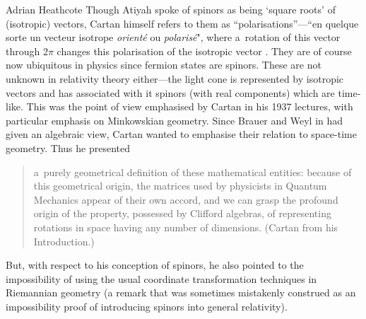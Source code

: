 \begin{artengenv}{Adrian Heathcote}
Though Atiyah spoke of spinors as being `square roots' of (isotropic) vectors, Cartan himself refers to them as ``polarisations''---``en quelque sorte un vecteur isotrope \textit{orienté} ou \textit{polarisé}", where a~rotation of this vector through 2$\pi$ changes this polarisation of the isotropic vector \parencite[42]{cartan_theory_1966}. They are of course now ubiquitous in physics since fermion states are spinors. These are not unknown in relativity theory either---the light cone is represented by isotropic vectors and has associated with it spinors (with real components) which are time-like. This was the point of view emphasised by Cartan in his 1937 lectures, with particular emphasis on Minkowskian geometry. Since Brauer and Weyl in \parencite*{brauer_spinors_1935} had given an algebraic view, Cartan wanted to emphasise their relation to space-time geometry. Thus he presented 
\begin{quotation}\noindent
\xelip a~purely geometrical definition of these mathematical entities: because of this geometrical origin, the matrices used by physicists in Quantum Mechanics appear of their own accord, and we can grasp the profound origin of the property, possessed by Clifford algebras, of representing rotations in space having any number of dimensions. (Cartan \parencite*{cartan_theory_1966} from his Introduction.)
\end{quotation}
But, with respect to his conception of spinors, he also pointed to the impossibility of using the usual coordinate transformation techniques in Riemannian geometry (a remark that was sometimes mistakenly construed as an impossibility proof of introducing spinors into general relativity).


\end{artengenv}
